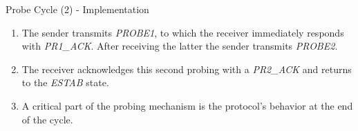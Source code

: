 \begin{frame}{Probe Cycle (2) - Implementation}
   \begin{enumerate}
	\item  The sender transmits \textit{PROBE1}, to which the receiver
    	       immediately responds with \textit{PR1_ACK}. After receiving
	       the latter the sender transmits \textit{PROBE2}.
  	\item  The receiver acknowledges this second probing
	       with a \textit{PR2_ACK} and returns to the \textit{ESTAB} state.
  	\item  A critical part of the probing mechanism is the
    	       protocol's behavior at the end of the cycle.
   \end{enumerate}
\end{frame}

